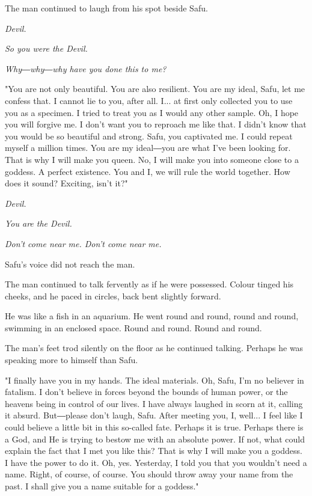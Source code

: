 The man continued to laugh from his spot beside Safu.

\emph{Devil.}

\emph{So you were the Devil.}

\emph{Why―why―why have you done this to me?}

"You are not only beautiful. You are also resilient. You are my ideal,
Safu, let me confess that. I cannot lie to you, after all. I... at first
only collected you to use you as a specimen. I tried to treat you as I
would any other sample. Oh, I hope you will forgive me. I don't want you
to reproach me like that. I didn't know that you would be so beautiful
and strong. Safu, you captivated me. I could repeat myself a million
times. You are my ideal―you are what I've been looking for. That is why
I will make you queen. No, I will make you into someone close to a
goddess. A perfect existence. You and I, we will rule the world
together. How does it sound? Exciting, isn't it?"

\emph{Devil.}

\emph{You are the Devil.}

\emph{Don't come near me. Don't come near me.}

Safu's voice did not reach the man.

The man continued to talk fervently as if he were possessed. Colour
tinged his cheeks, and he paced in circles, back bent slightly forward.

He was like a fish in an aquarium. He went round and round, round and
round, swimming in an enclosed space. Round and round. Round and round.

The man's feet trod silently on the floor as he continued talking.
Perhaps he was speaking more to himself than Safu.

"I finally have you in my hands. The ideal materials. Oh, Safu, I'm no
believer in fatalism. I don't believe in forces beyond the bounds of
human power, or the heavens being in control of our lives. I have always
laughed in scorn at it, calling it absurd. But―please don't laugh, Safu.
After meeting you, I, well... I feel like I could believe a little bit
in this so-called fate. Perhaps it is true. Perhaps there is a God, and
He is trying to bestow me with an absolute power. If not, what could
explain the fact that I met you like this? That is why I will make you a
goddess. I have the power to do it. Oh, yes. Yesterday, I told you that
you wouldn't need a name. Right, of course, of course. You should throw
away your name from the past. I shall give you a name suitable for a
goddess."

